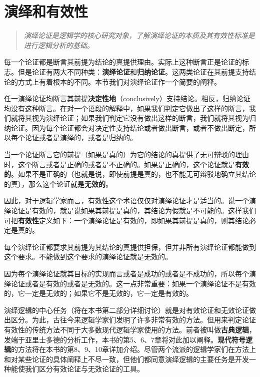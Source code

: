 \section{演绎和有效性}

\begin{quotation}
\textit{演绎论证是逻辑学的核心研究对象，了解演绎论证的本质及其有效性标准是进行逻辑分析的基础。}
\end{quotation}

每一个论证都是断言其前提为结论的真提供理由。实际上这种断言正是论证的标志。但是论证有两大不同种类：\textbf{演绎论证}和\textbf{归纳论证}。这两类论证在其前提支持结论的方式上有着根本的不同。本节我们对演绎论证作一个简要的阐释。

任一演绎论证均断言其前提\textbf{决定性地}（conclusively）支持结论。相反，归纳论证均没有这种断言。在对一个语段的解释中，如果我们判定它做出了这样的断言，我们就将其视为演绎论证；如果我们判定它没有做出这样的断言，我们就将其视为归纳论证。因为每个论证都会对决定性支持结论或者做出断言，或者不做出断定，所以每个论证或者是演绎的，或者是归纳的。

当一个论证断言它的前提（如果是真的）为它的结论的真提供了无可辩驳的理由时，这个断言或者是正确的或者是不正确的。如果是正确的，这个论证就是\textbf{有效的}。如果不是正确的（也就是说，即使前提是真的，也不能无可辩驳地确立其结论的真），那么这个论证就是\textbf{无效的}。

因此，对于逻辑学家而言，有效性这个术语仅仅对演绎论证才是适当的。说一个演绎论证是有效的，就是说如果其前提是真的，其结论为假就是不可能的。这样我们可把\textbf{有效性}定义如下：一个演绎论证是有效的，即如果其前提是真的，则其结论必定是真的。

每个演绎论证都要求其前提为其结论的真提供担保，但并非所有演绎论证都能做到这个要求。不能做到这个要求的演绎论证就是无效的。

因为每个演绎论证就其目标的实现而言或者是成功的或者是不成功的，所以每个演绎论证或者是有效的或者是无效的。这一点非常重要：如果一个演绎论证不是有效的，它一定是无效的；如果它不是无效的，它一定是有效的。

演绎逻辑的中心任务（将在本书第二部分详细讨论）就是对有效论证和无效论证做出区分。为此，古往今来逻辑学家们发明了许多非常有效的方法。但用来判定论证有效性的传统方法不同于大多数现代逻辑学家使用的方法。前者被叫做\textbf{古典逻辑}，发端于亚里士多德的分析工作，本书的第5、6、7章将对此加以阐释。\textbf{现代符号逻辑}的方法将在本书的第8、9、10章详加介绍。尽管两个流派的逻辑学家们在方法上和对某些论证的具体阐释上不尽一致，但他们都同意演绎逻辑的主要任务是开发一种能使我们区分有效论证与无效论证的工具。

\begin{center}
\end{center} 